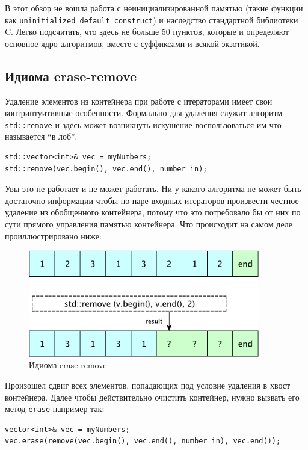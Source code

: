 \documentclass[a4paper,12pt,oneside]{book}
\begin{document}
В этот обзор не вошла работа с неинициализированной памятью (такие функции как \lstinline!uninitialized_default_construct!) и наследство стандартной библиотеки C. Легко подсчитать, что здесь не больше 50 пунктов, которые и определяют основное ядро алгоритмов, вместе с суффиксами и всякой экзотикой.

\subsection{Идиома erase-remove}\label{subsub:eraseremove}

Удаление элементов из контейнера при работе с итераторами имеет свои контринтуитивные особенности. Формально для удаления служит алгоритм \lstinline!std::remove! и здесь может возникнуть искушение воспользоваться им что называется ``в лоб''.

\begin{lstlisting}
std::vector<int>& vec = myNumbers;
std::remove(vec.begin(), vec.end(), number_in);
\end{lstlisting}

Увы это не работает и не может работать. Ни у какого алгоритма не может быть достаточно информации чтобы по паре входных итераторов произвести честное удаление из обобщенного контейнера, потому что это потребовало бы от них по сути прямого управления памятью контейнера. Что происходит на самом деле проиллюстрировано ниже:

\begin{figure}[h!]
\centering
\includegraphics[width=0.9\textwidth]{illustrations/erase-remove-crop.pdf}
\caption{Идиома erase-remove}
\label{fig:erase_remove}
\end{figure}

Произошел сдвиг всех элементов, попадающих под условие удаления в хвост контейнера. Далее чтобы действительно очистить контейнер, нужно вызвать его метод \lstinline!erase! например так:

\begin{lstlisting}
vector<int>& vec = myNumbers;
vec.erase(remove(vec.begin(), vec.end(), number_in), vec.end());
\end{lstlisting}
\end{document}
